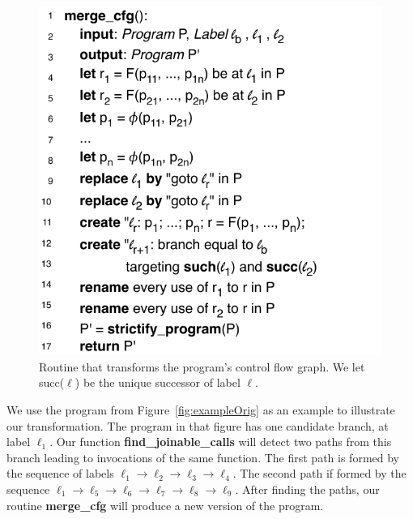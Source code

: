\documentclass[times,10pt,twocolumn]{article}
\begin{document}
\begin{figure}[hbt]
\begin{center}
\includegraphics[width=1\columnwidth]{images/merge_cfg}
\end{center}
\caption{\label{fig:merge_cfg}
Routine that transforms the program's control flow graph.
We let succ($\ell$) be the unique successor of label $\ell$.}
\end{figure}

We use the program from Figure~\ref{fig:exampleOrig} as an example to
illustrate our transformation.
The program in that figure has one candidate branch, at label $\ell_1$.
Our function \textbf{find\_joinable\_calls} will detect two paths from this
branch leading to invocations of the same function.
The first path is formed by the sequence of labels $\ell_1 \rightarrow \ell_2
 \rightarrow \ell_3 \rightarrow \ell_4$.
The second path if formed by the sequence $\ell_1 \rightarrow \ell_5
 \rightarrow \ell_6 \rightarrow \ell_7 \rightarrow \ell_8 \rightarrow \ell_9$.
After finding the paths, our routine \textbf{merge\_cfg} will produce a new
version of the program.
\end{document}
